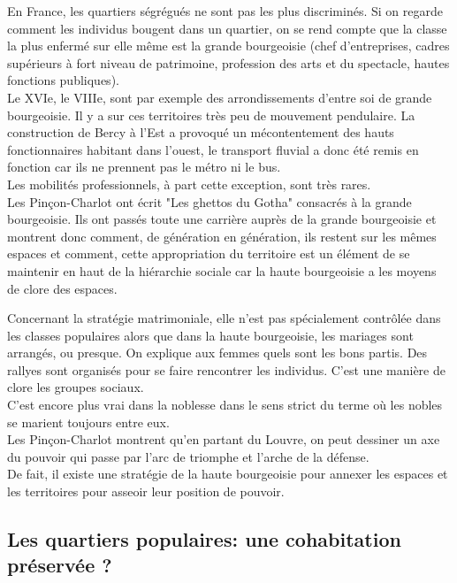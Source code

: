 \documentclass[12pt, a4paper, openany]{book}
\begin{document}
En France, les quartiers ségrégués ne sont pas les plus discriminés. Si on regarde comment les individus bougent dans un quartier, on se rend compte que la classe la plus enfermé sur elle même est la grande bourgeoisie (chef d'entreprises, cadres supérieurs à fort niveau de patrimoine, profession des arts et du spectacle, hautes fonctions publiques). \\
Le XVIe, le VIIIe, sont par exemple des arrondissements d'entre soi de grande bourgeoisie. Il y a sur ces territoires très peu de mouvement pendulaire. La construction de Bercy à l'Est a provoqué un mécontentement des hauts fonctionnaires habitant dans l'ouest, le transport fluvial a donc été remis en fonction car ils ne prennent pas le métro ni le bus. \\
Les mobilités professionnels, à part cette exception, sont très rares. \\
Les Pinçon-Charlot ont écrit "Les ghettos du Gotha" consacrés à la grande bourgeoisie. Ils ont passés toute une carrière auprès de la grande bourgeoisie et montrent donc comment, de génération en génération, ils restent sur les mêmes espaces et comment, cette appropriation du territoire est un élément de se maintenir en haut de la hiérarchie sociale car la haute bourgeoisie a les moyens de clore des espaces.


Concernant la stratégie matrimoniale, elle n'est pas spécialement contrôlée dans les classes populaires alors que dans la haute bourgeoisie, les mariages sont arrangés, ou presque. On explique aux femmes quels sont les bons partis. Des rallyes sont organisés pour se faire rencontrer les individus. C'est une manière de clore les groupes sociaux. \\
C'est encore plus vrai dans la noblesse dans le sens strict du terme où les nobles se marient toujours entre eux. \\
Les Pinçon-Charlot montrent qu'en partant du Louvre, on peut dessiner un axe du pouvoir qui passe par l'arc de triomphe et l'arche de la défense. \\
De fait, il existe une stratégie de la haute bourgeoisie pour annexer les espaces et les territoires pour asseoir leur position de pouvoir. 

\subsection{Les quartiers populaires: une cohabitation préservée ?}
\end{document}
